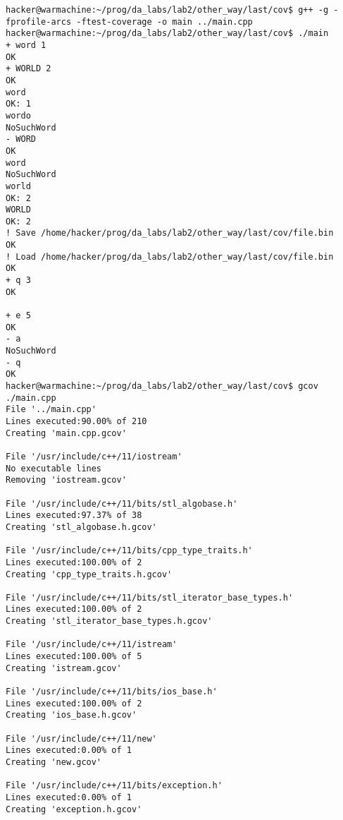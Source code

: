 \documentclass[12pt]{article}
\begin{document}
\begin{lstlisting}
hacker@warmachine:~/prog/da_labs/lab2/other_way/last/cov$ g++ -g -fprofile-arcs -ftest-coverage -o main ../main.cpp
hacker@warmachine:~/prog/da_labs/lab2/other_way/last/cov$ ./main
+ word 1
OK
+ WORLD 2
OK
word
OK: 1
wordo
NoSuchWord
- WORD
OK
word
NoSuchWord
world
OK: 2
WORLD
OK: 2
! Save /home/hacker/prog/da_labs/lab2/other_way/last/cov/file.bin
OK
! Load /home/hacker/prog/da_labs/lab2/other_way/last/cov/file.bin
OK
+ q 3
OK

+ e 5
OK
- a
NoSuchWord
- q
OK
hacker@warmachine:~/prog/da_labs/lab2/other_way/last/cov$ gcov ./main.cpp
File '../main.cpp'
Lines executed:90.00% of 210
Creating 'main.cpp.gcov'

File '/usr/include/c++/11/iostream'
No executable lines
Removing 'iostream.gcov'

File '/usr/include/c++/11/bits/stl_algobase.h'
Lines executed:97.37% of 38
Creating 'stl_algobase.h.gcov'

File '/usr/include/c++/11/bits/cpp_type_traits.h'
Lines executed:100.00% of 2
Creating 'cpp_type_traits.h.gcov'

File '/usr/include/c++/11/bits/stl_iterator_base_types.h'
Lines executed:100.00% of 2
Creating 'stl_iterator_base_types.h.gcov'

File '/usr/include/c++/11/istream'
Lines executed:100.00% of 5
Creating 'istream.gcov'

File '/usr/include/c++/11/bits/ios_base.h'
Lines executed:100.00% of 2
Creating 'ios_base.h.gcov'

File '/usr/include/c++/11/new'
Lines executed:0.00% of 1
Creating 'new.gcov'

File '/usr/include/c++/11/bits/exception.h'
Lines executed:0.00% of 1
Creating 'exception.h.gcov'


\end{lstlisting}
\end{document}
